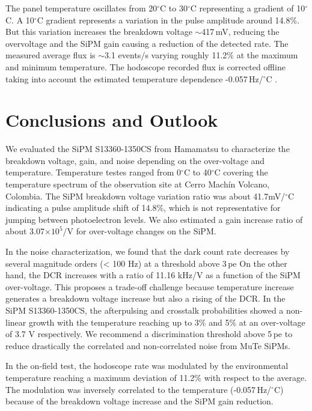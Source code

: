 \documentclass[a4paper,11pt]{article}
\begin{document}
The panel temperature oscillates from 20$^{\circ}$C to 30$^{\circ}$C representing a gradient of 10$^{\circ}$C. A 10$^{\circ}$C gradient represents a variation in the pulse amplitude around 14.8$\%$.
But this variation increases the breakdown voltage $\sim$417\,mV, reducing the overvoltage and the SiPM gain causing a reduction of the detected rate. The measured average flux is $\sim$3.1 events/s varying roughly 11.2$\%$ at the maximum and minimum temperature. The hodoscope recorded flux is corrected offline taking into account the estimated temperature dependence -0.057\,Hz/$^{\circ}$C \cite{penarodriguez2021}.


\section{Conclusions and Outlook}
\label{sec:conc}

We evaluated the SiPM S13360-1350CS from Hamamatsu to characterize the breakdown voltage, gain, and noise depending on the over-voltage and temperature. Temperature testes ranged from 0$^{\circ}$C to 40$^{\circ}$C covering the temperature spectrum of the observation site at Cerro Mach\'in Volcano, Colombia. The SiPM breakdown voltage variation ratio was about 41.7mV/$^{\circ}$C indicating a pulse amplitude shift of 14.8$\%$, which is not representative for jumping between photoelectron levels. We also estimated a gain increase ratio of about 3.07$\times 10^5$/V for over-voltage changes on the SiPM. 

In the noise characterization, we found that the dark count rate decreases by several magnitude orders (< 100 Hz) at a threshold above 3\,pe On the other hand, the DCR increases with a ratio of 11.16 kHz/V as a function of the SiPM over-voltage. This proposes a trade-off challenge because temperature increase generates a breakdown voltage increase but also a rising of the DCR. In the SiPM S13360-1350CS, the afterpulsing and crosstalk probabilities showed a non-linear growth with the temperature reaching up to 3$\%$ and 5$\%$ at an over-voltage of 3.7 V respectively. We recommend a discrimination threshold above 5\,pe to reduce drastically the correlated and non-correlated noise from MuTe SiPMs. 

In the on-field test, the hodoscope rate was modulated by the environmental temperature reaching a maximum deviation of 11.2$\%$ with respect to the average. The modulation was inversely correlated to the temperature (-0.057\,Hz/$^{\circ}$C) because of the breakdown voltage increase and the SiPM gain reduction.
\end{document}
